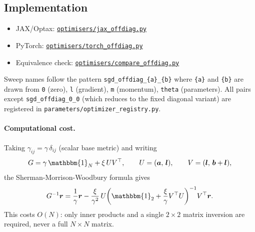 \documentclass{article}
\newcommand{\Id}{\mathbbm{1}}
\newcommand{\vecb}[1]{\boldsymbol{#1}}
\begin{document}
\subsection{Implementation}
\begin{itemize}
    \item JAX/Optax: \href{https://github.com/Noah-Everett/Induced-Metric-Optimiser/blob/main/optimisers/jax_offdiag.py}{\texttt{optimisers/jax\_offdiag.py}}
    \item PyTorch: \href{https://github.com/Noah-Everett/Induced-Metric-Optimiser/blob/main/optimisers/torch_offdiag.py}{\texttt{optimisers/torch\_offdiag.py}}
    \item Equivalence check: \href{https://github.com/Noah-Everett/Induced-Metric-Optimiser/blob/main/optimisers/compare_offdiag.py}{\texttt{optimisers/compare\_offdiag.py}}
\end{itemize}
Sweep names follow the pattern \texttt{sgd\_offdiag\_\{a\}\_\{b\}} where \texttt{\{a\}} and \texttt{\{b\}} are drawn from
\texttt{0} (zero), \texttt{l} (gradient), \texttt{m} (momentum), \texttt{theta} (parameters).
All pairs except \texttt{sgd\_offdiag\_0\_0} (which reduces to the fixed diagonal variant) are registered in \texttt{parameters/optimizer\_registry.py}.

\paragraph{Computational cost.}
Taking $\gamma_{ij}=\gamma\,\delta_{ij}$ (scalar base metric) and writing $$
    G = \gamma\,\Id_N + \xi\,U V^\top, \qquad U = (\vecb{a},\,\vecb{l}), \qquad V = (\vecb{l},\,\vecb{b}+\vecb{l}),
$$ the Sherman-Morrison-Woodbury formula gives $$
    G^{-1}\vecb{r} = \frac{1}{\gamma}\vecb{r} - \frac{\xi}{\gamma^2}\,U\!\left(\Id_2 + \frac{\xi}{\gamma}V^\top U\right)^{-1}\!V^\top\vecb{r}.
$$ This costs $O(N)$: only inner products and a single $2\times 2$ matrix inversion are required, never a full $N\times N$ matrix.
\end{document}
